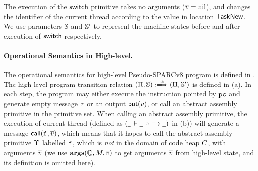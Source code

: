 The execution of the $\mathsf{switch}{}$ primitive takes no arguments
($\overline{v} = \text{nil}$), and changes the identifier
of the current thread according to the value
in location $\mathsf{TaskNew}$. We use parameters $\mathbb{S}$
and $\mathbb{S}'$ to represent the machine states before
and after execution of $\mathsf{switch}{}$ respectively.

\paragraph{\textbf{Operational Semantics in High-level.}}
The operational semantics for high-level Pseudo-SPARCv8 program
is defined in \Fig{\ref{fig:selected-opsem-high-level-prog}}.
The high-level program transition relation
$\HGlobTrans{(\HMd, \hpstate)}{\hmsg}{(\HMd, \hpstate')}$ is defined
in \Fig{\ref{fig:selected-opsem-high-level-prog}} (a). In each step,
the program may either execute the instruction pointed by $\texttt{pc}$
and generate empty message $\tau$ or an output $\textsf{out}({v})$,
or call  an abstract assembly primitive in the primitive set.
When calling an abstract assembly primitive,
the execution of current thread (defined as
$(\hlocalstep{\notCare}{\notCare}{\ \notCare \ }{\notCare})$ in
\Fig{\ref{fig:selected-opsem-high-level-prog}} (b)) will generate
a message $\textsf{call}({\texttt{f}_{}, \overline{v}})$, which means that it
hopes to call the abstract assembly primitive $\Upsilon$ labelled
$\texttt{f}_{}$, which is {\it not} in the domain of code heap $C$,
with arguments $\overline{v}$
(we use $\textbf{args}(\mathbb{Q}, M, \overline{v})$
to get arguments $\overline{v}$
from high-level state, and its definition is omitted here).

